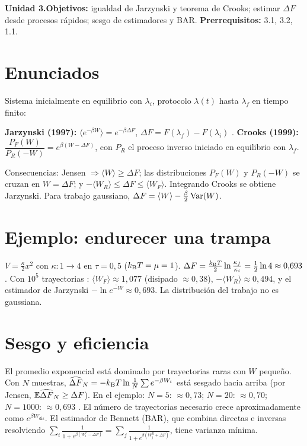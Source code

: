 \documentclass[11pt,a4paper]{article}
\begin{document}

\noindent\textbf{Unidad 3.}\quad\textbf{Objetivos:} igualdad de Jarzynski y teorema de Crooks; estimar $\Delta F$ desde procesos
rápidos; sesgo de estimadores y BAR. \textbf{Prerrequisitos:} 3.1, 3.2, 1.1.

\section{Enunciados}
Sistema inicialmente en equilibrio con $\lambda_i$, protocolo $\lambda(t)$ hasta $\lambda_f$ en tiempo finito:
\begin{resultado}
\textbf{Jarzynski (1997):} $\langle e^{-\beta W}\rangle=e^{-\beta\Delta F}$, $\Delta F=F(\lambda_f)-F(\lambda_i)$ \cite{jarzynski}.
\textbf{Crooks (1999):} $\dfrac{P_F(W)}{P_R(-W)}=e^{\beta(W-\Delta F)}$, con $P_R$ el proceso inverso iniciado en equilibrio con $\lambda_f$.
\end{resultado}
Consecuencias: Jensen $\Rightarrow\langle W\rangle\ge\Delta F$; las distribuciones $P_F(W)$ y $P_R(-W)$ se cruzan en $W=\Delta F$; y
$-\langle W_R\rangle\le\Delta F\le\langle W_F\rangle$. Integrando Crooks se obtiene Jarzynski. Para trabajo gaussiano,
$\Delta F=\langle W\rangle-\frac\beta2\operatorname{Var}(W)$.

\section{Ejemplo: endurecer una trampa}
$V=\frac\kappa2x^2$ con $\kappa:1\to4$ en $\tau=0{,}5$ ($k_{\mathrm B} T=\mu=1$). $\Delta F=\frac{k_{\mathrm B} T}2\ln\frac{\kappa_f}{\kappa_i}=\frac12\ln4\approx0{,}693$.
Con $10^5$ trayectorias \evS: $\langle W_F\rangle\approx1{,}077$ (disipado $\approx0{,}38$), $-\langle W_R\rangle\approx0{,}494$, y el estimador de
Jarzynski $-\ln\overline{e^{-W}}\approx0{,}693$. La distribución del trabajo no es gaussiana.

\section{Sesgo y eficiencia}
El promedio exponencial está dominado por trayectorias raras con $W$ pequeño. Con $N$ muestras, $\widehat{\Delta F}_N=-k_{\mathrm B} T\ln\frac1N\sum e^{-\beta W_i}$
está sesgado hacia arriba (por Jensen, $\mathbb{E}\widehat{\Delta F}_N\ge\Delta F$). En el ejemplo: $N=5$: $\approx0{,}73$; $N=20$: $\approx0{,}70$;
$N=1000$: $\approx0{,}693$ \evS. El número de trayectorias necesario crece aproximadamente como $e^{\beta W_{\text{dis}}}$. El estimador de
Bennett (BAR), que combina directas e inversas resolviendo
$\sum_i\frac{1}{1+e^{\beta(W_i^F-\Delta F)}}=\sum_j\frac{1}{1+e^{\beta(W_j^R+\Delta F)}}$, tiene varianza mínima.
\end{document}
